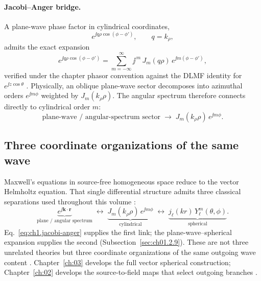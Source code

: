 \paragraph{Jacobi--Anger bridge.}
A plane-wave phase factor in cylindrical coordinates,
\begin{equation}
\label{eq:ch1.plane-phase-cyl}
e^{\jj q\rho\cos(\phi-\phi')},
\qquad q=k_\rho,
\end{equation}
admits the exact expansion \cite{stratton1941,jackson1999}
\begin{equation}
\label{eq:ch1.jacobi-anger}
e^{\jj q\rho\cos(\phi-\phi')}
=
\sum_{m=-\infty}^{\infty}\jj^{\,m}\,J_m(q\rho)\,e^{\jj m(\phi-\phi')},
\end{equation}
verified under the chapter phasor convention against the DLMF identity for $e^{\jj z\cos\theta}$ \cite{stratton1941}. Physically, an oblique plane-wave sector decomposes into azimuthal orders $e^{\jj m\phi}$ weighted by $J_m(k_\rho\rho)$. The angular spectrum therefore connects directly to cylindrical order $m$:
\begin{equation}
\label{eq:ch1.angular-to-cylindrical-bridge}
\text{plane-wave / angular-spectrum sector}
\;\longrightarrow\;
J_m(k_\rho\rho)\,e^{\jj m\phi}.
\end{equation}


\subsection{Three coordinate organizations of the same wave}
\label{sec:ch01.2.7b}

Maxwell's equations in source-free homogeneous space reduce to the vector Helmholtz equation. That single differential structure admits three classical separations used throughout this volume \cite{stratton1941,hansen1988}:
\begin{equation}
\label{eq:ch1.three-rep-chain}
\underbrace{e^{\jj\mathbf{k}\cdot\mathbf{r}}}_{\text{plane / angular spectrum}}
\;\longleftrightarrow\;
\underbrace{J_m(k_\rho\rho)\,e^{\jj m\phi}}_{\text{cylindrical}}
\;\longleftrightarrow\;
\underbrace{j_\ell(kr)\,Y_\ell^m(\theta,\phi)}_{\text{spherical}}.
\end{equation}
Eq.~\eqref{eq:ch1.jacobi-anger} supplies the first link; the plane-wave--spherical expansion supplies the second (Subsection~\ref{sec:ch01.2.9}). These are not three unrelated theories but three coordinate organizations of the same outgoing wave content \cite{stratton1941}. Chapter~\ref{ch:03} develops the full vector spherical construction; Chapter~\ref{ch:02} develops the source-to-field maps that select outgoing branches \cite{harrington2001,tai1994}.

